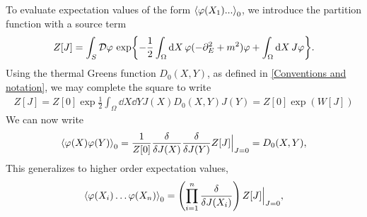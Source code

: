 To evaluate expectation values of the form $\ex{\varphi(X_1) ... }_0$, we introduce the partition function with a source term
\begin{align}
    Z[J] = \int_S \mathcal{D} \varphi \, \exp{
        - \frac{1}{2} \int_\Omega \dd X \, \varphi (-\partial_E^2 + m^2) \varphi
        + \int_\Omega \dd X \, J \varphi
    }.
\end{align}
Using the thermal Greens function $D_0(X, Y)$, as defined in \autoref{Conventions and notation}, we may complete the square to write
\begin{align}
    Z[J] = Z[0]\exp{\frac{1}{2} \int_{\Omega} \dd X \dd Y J(X) D_0(X, Y) J(Y)}
    = Z[0] \exp(W[J])
\end{align}
We can now write
\begin{equation}
    \ex{\varphi(X)\varphi(Y)}_0 
    = \frac{1}{Z[0]}
    \frac{\delta}{\delta J(X)} \frac{\delta}{\delta J(Y)} 
    Z[J] \Big|_{J=0} 
    = D_0(X, Y),
\end{equation}
This generalizes to higher order expectation values,
\begin{equation}
    \ex{\varphi(X_i) \dots \varphi(X_n)}_0
    = \left(\prod_{i=1}^n \frac{\delta}{\delta J(X_i)}\right) 
    Z[J] \Big|_{J=0},
\end{equation}

